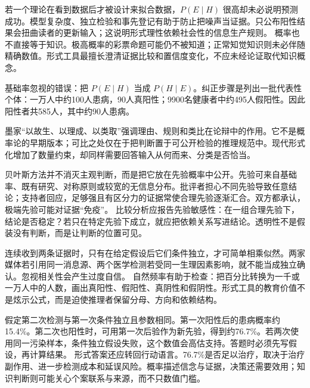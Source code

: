 若一个理论在看到数据后才被设计来拟合数据，$P(E\mid H)$ 很高却未必说明预测成功。模型复杂度、独立检验和事先登记有助于防止把噪声当证据。只公布阳性结果会扭曲读者的更新输入；这说明形式理性依赖社会性的信息生产规则。 概率也不直接等于知识。极高概率的彩票命题可能仍不被知道；正常知觉知识则未必伴随精确数值。形式工具最擅长澄清证据比较和置信度变化，不应未经论证取代知识概念。

\begin{argumentbox}
基础率忽视的错误：把 $P(E\mid H)$ 当成 $P(H\mid E)$。纠正步骤是列出一批代表性个体：一万人中约100人患病，90人真阳性；9900名健康者中约495人假阳性。因此阳性者共585人，其中约90人患病。
\end{argumentbox}

\begin{comparison}
墨家“以故生、以理成、以类取”强调理由、规则和类比在论辩中的作用。它不是概率论的早期版本；可比之处仅在于把判断置于可公开检验的推理规范中。现代形式化增加了数量约束，却同样需要回答输入从何而来、分类是否恰当。
\end{comparison}

贝叶斯方法并不消灭主观判断，而是把它放在先验概率中公开。先验可来自基础率、既有研究、对称原则或较宽的无信息分布。批评者担心不同先验导致任意结论；支持者回应，足够强且有区分力的证据常使合理先验逐渐汇合。双方都承认，极端先验可能对证据“免疫”。 比较分析应报告先验敏感性：在一组合理先验下，结论是否稳定？若只在特定先验下成立，就应把依赖关系写进结论。透明性不是假装没有判断，而是让判断的位置可见。

连续收到两条证据时，只有在给定假设后它们条件独立，才可简单相乘似然。两家媒体若引用同一消息源、两个医学检测若受同一生理因素影响，就不能当成独立确认。忽视相关性会产生过度自信。 自然频率有助于检查：把百分比转换为一千或一万人中的人数，画出真阳性、假阳性、真阴性和假阴性。形式工具的教育价值不是炫示公式，而是迫使推理者保留分母、方向和依赖结构。

假定第二次检测与第一次条件独立且参数相同。第一次阳性后的患病概率约15.4\%。第二次也阳性时，可用第一次后验作为新先验，得到约76.7\%。若两次使用同一污染样本，条件独立假设失败，这个数值会高估支持。答题时必须先写假设，再计算结果。 形式答案还应转回行动语言。76.7\%是否足以治疗，取决于治疗副作用、进一步检测成本和延误风险。概率描述信念与证据，决策还需要效用；知识判断则可能关心个案联系与来源，而不只数值门槛。
